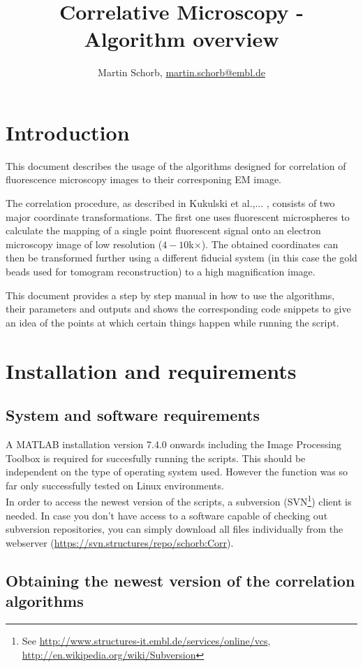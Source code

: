 \documentclass[10pt,a4paper,onepage,DIV12]{scrartcl}
\title{Correlative Microscopy - Algorithm overview}
\author{Martin Schorb, \href{mailto:martin.schorb@embl.de}{martin.schorb@embl.de}}
\begin{document}
 \maketitle
\section{Introduction}
This document describes the usage of the algorithms designed for correlation of fluorescence microscopy images to their corresponing EM image. 

The correlation procedure, as described in Kukulski et al.,... , consists of two major coordinate transformations. The first one uses fluorescent microspheres to calculate the mapping of a single point fluorescent signal onto an electron microscopy image of low resolution ($4-10 $k$\times$). The obtained coordinates can then be transformed further using a different fiducial system (in this case the gold beads used for tomogram reconstruction) to a high magnification image.

This document provides a step by step manual in how to use the algorithms, their parameters and outputs and shows the corresponding code snippets to give an idea of the points at which certain things happen while running the script.
\section{Installation and requirements}

\subsection{System and software requirements}A MATLAB\textsuperscript{\textregistered} 
installation version 7.4.0 onwards including the Image Processing Toolbox is required for succesfully running the scripts. This should be independent on the type of operating system used. However the function was so far only successfully tested on Linux environments. 
\\

In order to access the newest version of the scripts, a subversion (SVN\footnote{See \url{http://www.structures-it.embl.de/services/online/vcs},\; \url{http://en.wikipedia.org/wiki/Subversion}}) client is needed. In case you don't have access to a software capable of checking out subversion repositories, you can simply download all files individually from the webserver (\url{https://svn.structures/repo/schorb:Corr}).

\subsection{Obtaining the newest version of the correlation algorithms}
\end{document}
